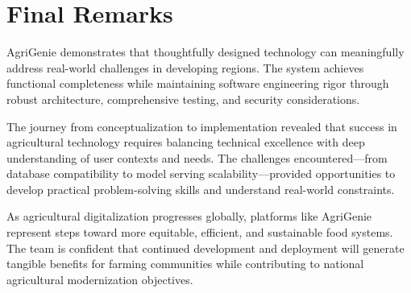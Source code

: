 \documentclass[12pt,a4paper]{report}
\begin{document}
\section{Final Remarks}

AgriGenie demonstrates that thoughtfully designed technology can meaningfully address real-world challenges in developing regions. The system achieves functional completeness while maintaining software engineering rigor through robust architecture, comprehensive testing, and security considerations.

The journey from conceptualization to implementation revealed that success in agricultural technology requires balancing technical excellence with deep understanding of user contexts and needs. The challenges encountered---from database compatibility to model serving scalability---provided opportunities to develop practical problem-solving skills and understand real-world constraints.

As agricultural digitalization progresses globally, platforms like AgriGenie represent steps toward more equitable, efficient, and sustainable food systems. The team is confident that continued development and deployment will generate tangible benefits for farming communities while contributing to national agricultural modernization objectives.

\newpage
\end{document}
